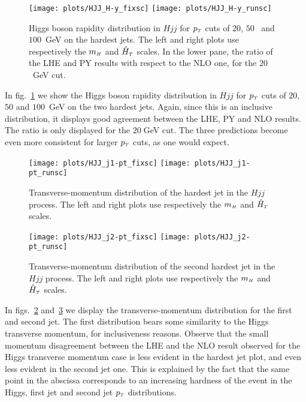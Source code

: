 \documentclass[paper]{JHEP3}
\newlength{\hfig}
\newlength{\hfigs}
\newcommand\mH{m_{\sss  H}}
\newcommand\HThat{\hat{H}_{\sss  T}}
\newcommand\sss{\mathchoice%
{\displaystyle}%
{\scriptstyle}%
{\scriptscriptstyle}%
{\scriptscriptstyle}%
}
\newcommand\pT{p_{\sss T}}
\begin{document}
\begin{figure}[htb]
\begin{center}
\texttt{[image: plots/HJJ\_H-y\_fixsc]}  \nolinebreak
\texttt{[image: plots/HJJ\_H-y\_runsc]} 
\caption{Higgs boson rapidity distribution in $Hjj$ for $\pT$ cuts of $20$,
  $50$~ and $100$~GeV on the hardest jets. The left and right plots use
  respectively the $\mH$ and $\HThat$ scales.  In the lower pane, the ratio
  of the LHE and PY results with respect to the NLO one, for the $20$~GeV
  cut.}
\label{fig:HJJ_H-y}
\end{center}
\end{figure}
In fig.~\ref{fig:HJJ_H-y} we show the Higgs boson rapidity distribution in
$Hjj$ for $\pT$ cuts of $20$, $50$ and $100$~GeV on the two hardest
jets. Again, since this is an inclusive distribution, it displays good
agreement between the LHE, PY and NLO results. The ratio is only displayed
for the $20\;$GeV cut. The three predictions become even more consistent for
larger $\pT$ cuts, as one would expect.


\begin{figure}[htb]
\begin{center}
\texttt{[image: plots/HJJ\_j1-pt\_fixsc]}  \nolinebreak
\texttt{[image: plots/HJJ\_j1-pt\_runsc]} 
\caption{Transverse-momentum distribution of the hardest jet in the $Hjj$
  process. The left and right plots use respectively the $\mH$ and $\HThat$
  scales.}
\label{fig:HJJ_j1-pt}
\end{center}
\end{figure}

\begin{figure}[htb]
\begin{center}
\texttt{[image: plots/HJJ\_j2-pt\_fixsc]}   \nolinebreak
\texttt{[image: plots/HJJ\_j2-pt\_runsc]} 
\caption{Transverse-momentum distribution of the second hardest jet in the
  $Hjj$ process. The left and right plots use respectively the $\mH$ and
  $\HThat$ scales.}
\label{fig:HJJ_j2-pt}
\end{center}
\end{figure}
In figs.~\ref{fig:HJJ_j1-pt} and~\ref{fig:HJJ_j2-pt} we display the
transverse-momentum distribution for the first and second jet. The first
distribution bears some similarity to the Higgs transverse momentum, for
inclusiveness reasons. Observe that the small momentum disagreement between
the LHE and the NLO result observed for the Higgs transverse momentum case is
less evident in the hardest jet plot, and even less evident in the second jet
one. This is explained by the fact that the same point in the abscissa
corresponds to an increasing hardness of the event in the Higgs, first jet
and second jet $\pT$ distributions.
\end{document}
